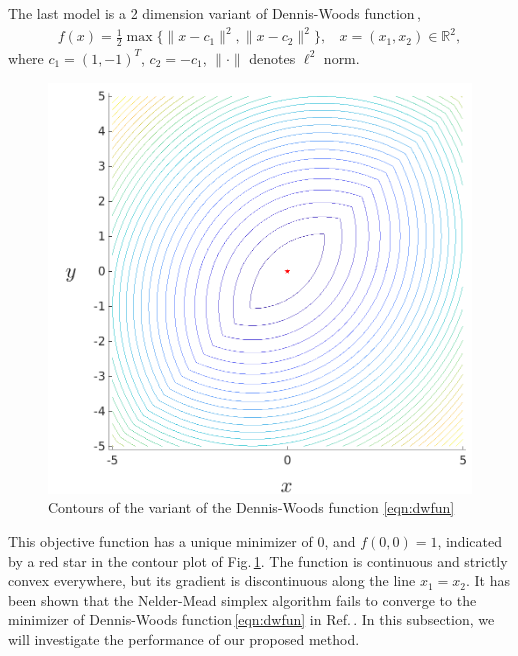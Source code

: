 \documentclass[final,1p,times]{elsarticle}
\def\bbR{\mathbb{R}}
\begin{document}
The last model is a 2 dimension variant of Dennis-Woods
function\,\cite{kolda2003optimization, dennis1987optimization},
\begin{align}
	f(x) = \frac{1}{2}\max\{\|x - c_1 \|^2, \|x - c_2
	\|^2\}, ~~~~ x=(x_1,x_2)\in\bbR^2,
	\label{eqn:dwfun}
\end{align}
where $c_1 = (1,-1)^T$, $c_2 = -c_1$, $\|\cdot\|$ denotes
$\ell^2$ norm. 
\begin{figure}[!htbp]
	\centering
	  \includegraphics[scale=0.2]{../figures/dWoods.png}
	\caption{Contours of the variant of the Dennis-Woods 
	function \eqref{eqn:dwfun}}
\label{fig:dwfun}
\end{figure}
This objective function has
a unique minimizer of $0$, and $f(0,0)=1$, indicated by a red
star in the contour plot of Fig.\,\ref{fig:dwfun}. 
The function is continuous and strictly convex everywhere,
but its gradient is discontinuous along the line $x_1 = x_2$. 
It has been shown that the Nelder-Mead simplex algorithm fails to
converge to the minimizer of Dennis-Woods function\,\eqref{eqn:dwfun} in
Ref.\,\cite{dennis1987optimization}. In this subsection, we will
investigate the performance of our proposed method.
\end{document}
